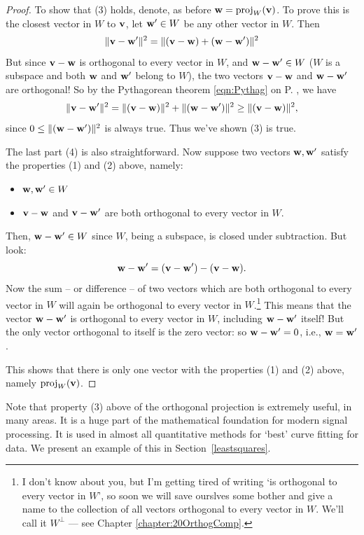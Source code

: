 \begin{proof}
To show that (3) holds, denote, as before $\mathbf{w} = \operatorname{proj}_W(\mathbf{v})$.  To prove this is the closest vector
in $W$ to $\mathbf{v}$, let $\mathbf{w}' \in W$ be any other vector in $W$.
Then
$$
\Vert \mathbf{v}- \mathbf{w}' \Vert^2 = \Vert (\mathbf{v} - \mathbf{w}) + (\mathbf{w} - \mathbf{w}') \Vert^2
$$
But since $\mathbf{v}-\mathbf{w}$ is orthogonal to every vector in $W$, and $\mathbf{w} - \mathbf{w}' \in W$ ($W$ is a subspace and both $\mathbf{w}$ and $\mathbf{w}'$ belong to $W$), the two vectors $ \mathbf{v} - \mathbf{w}$ and  $\mathbf{w} - \mathbf{w}'$
are orthogonal! So by the Pythagorean theorem \ref{eqn:Pythag} on P. \pageref{eqn:Pythag}, we have
$$
\Vert \mathbf{v}- \mathbf{w}' \Vert^2 = \Vert (\mathbf{v} - \mathbf{w})\Vert^2 + \Vert(\mathbf{w} - \mathbf{w}') \Vert^2 \geq \Vert (\mathbf{v} - \mathbf{w})\Vert^2,
$$
since $0\leq \Vert(\mathbf{w} - \mathbf{w}') \Vert^2$  is always true. Thus we've shown (3) is true.

The last part (4) is also straightforward. Now suppose two vectors $\mathbf{w},\mathbf{w}'$ satisfy the properties (1) and (2) above, namely:

\begin{itemize}
\item $\mathbf{w}, \mathbf{w}' \in W$
\item $\mathbf{v} - \mathbf{w}$ and $\mathbf{v}-\mathbf{w}'$ are both orthogonal to every vector in $W$.
\end{itemize}

Then, $\mathbf{w}- \mathbf{w}'\in W$ since $W$, being a subspace, is closed under subtraction. But look: $$\mathbf{w}- \mathbf{w}'= (\mathbf{v}-\mathbf{w}')-(\mathbf{v} - \mathbf{w}).$$ Now the sum  -- or difference -- of two vectors which are both orthogonal to every vector in $W$ will again be orthogonal to every vector in $W$.\footnote{I don't know about you, but I'm getting tired of writing `is orthogonal to every vector in $W$', so soon we will save ourslves some bother and give a name to the collection of all vectors orthogonal to every vector in $W$. We'll call it $W^\perp$ --- see Chapter \ref{chapter:20OrthogComp}.} This means that the vector $\mathbf{w}- \mathbf{w}'$ is orthogonal to every vector in $W$, including $\mathbf{w}- \mathbf{w}'$ itself! But the only vector orthogonal to itself is the zero vector: so $\mathbf{w}- \mathbf{w}'=0$, i.e., $\mathbf{w}= \mathbf{w}'$.

This  shows that  there is only one vector with the  properties (1) and (2) above, namely $\operatorname{proj}_W(\mathbf{v})$.

\end{proof}

Note that  property (3) above of the orthogonal projection is extremely useful, in many areas. It is a huge part of the mathematical foundation for modern signal processing. It is used in almost all quantitative methods for `best' curve fitting for data. We present an example of this in Section~\ref{leastsquares}. 

